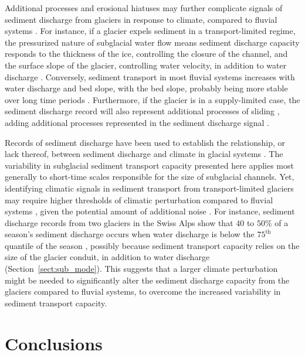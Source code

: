 \documentclass[11pt]{article}
\begin{document}
\begin{spacing}{1}
                    Additional processes and erosional hiatuses may further complicate signals of sediment discharge from glaciers in response to climate, compared to fluvial systems \citep{jansson2005,ganti2016}. 
    For instance, if a glacier expels sediment in a transport-limited regime, the pressurized nature of subglacial water flow means sediment discharge capacity responds to the thickness of the ice, controlling the closure of the channel, and the surface slope of the glacier, controlling water velocity, in addition to water discharge \citep[Section~\ref{sect:sub_mode}; ] []{rothlisberger1972,shreve1972}.
          Conversely, sediment transport in most fluvial systems increases with water discharge and bed slope, with the bed slope, probably being more stable over long time periods \citep[Section~\ref{sect:fluv}; e.g.][]{muller1968,whipple1999,wong2006}. 
          Furthermore, if the glacier is in a supply-limited case, the sediment discharge record will also represent additional processes of sliding  \citep{herman2015,seguinot2021}, adding additional processes represented in the sediment discharge signal \citep{delaney2019}.
          
           Records of sediment discharge have been used to establish the relationship, or lack thereof, between sediment discharge and climate in glacial systems \citep[e.g.][]{koppes2009a,willenbring2016,mariotti2021}.
          The variability in subglacial sediment transport capacity presented here applies most generally to short-time scales responsible for the size of subglacial channels.
        Yet, identifying climatic signals in sediment transport from transport-limited glaciers may require higher thresholds of climatic perturbation compared to fluvial systems \citep{tofelde2021}, given the potential amount of additional noise \citep{castletort2003,jerolmack2010,romans2016}.
          For instance, sediment discharge records from two glaciers in the Swiss Alps show that $40$ to $50$\% of a season's sediment discharge occurs when water discharge is below the $75^{\mathrm{th}}$ quantile of the season \citep{delaney2018}, possibly because sediment transport capacity relies on the size of the glacier conduit, in addition to water discharge (Section~\ref{sect:sub_mode}).
          This suggests that a larger climate perturbation might be needed to significantly alter the sediment discharge capacity from the glaciers compared to fluvial systems, to overcome the increased variability in sediment transport capacity.


          \section{Conclusions}
          

\end{spacing}
\end{document}
